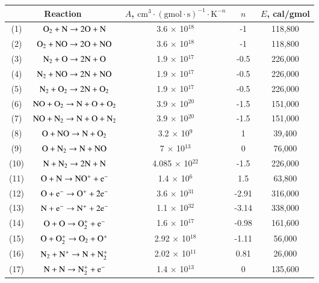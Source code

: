 \documentclass{warpdoc}
\renewcommand{\fontsizetable}{\footnotesize\scalefont{0.9}}
\begin{document}
%
\begin{table}[t]
\fontsizetable
\begin{center}
\begin{threeparttable}
\begin{tabular}{ccccc} 
\toprule
\multicolumn{2}{c}{Reaction} & $A$, $\textrm{cm}^3\cdot(\textrm{gmol}\cdot \textrm{s})^{-1}\cdot \textrm{K}^{-n}$ & $n$ & $E$, cal/gmol  \\ 
\midrule
(1) & $\rm O_2 + N \rightarrow 2O+N$ & 3.6 $\times$ 10$^{18}$  & -1 & 118,800 \\
(2) & $\rm O_2 + NO \rightarrow 2O+NO$ & 3.6 $\times$ 10$^{18}$ & -1 & 118,800 \\
(3) & $\rm N_2 + O \rightarrow 2N+O$ & 1.9 $\times$ 10$^{17}$ & -0.5 & 226,000 \\
(4) & $\rm N_2 + NO \rightarrow 2N+NO$ & 1.9 $\times$ 10$^{17}$ & -0.5 & 226,000 \\
(5) & $\rm N_2 + O_2 \rightarrow 2N+O_2$ & 1.9 $\times$ 10$^{17}$ & -0.5 & 226,000 \\
(6) & $\rm NO + O_2 \rightarrow N+O+O_2$ & 3.9 $\times$ 10$^{20}$ & -1.5 & 151,000 \\
(7) & $\rm NO + N_2 \rightarrow N+O+N_2$ & 3.9 $\times$ 10$^{20}$ & -1.5 & 151,000 \\
(8) & $\rm O + NO \rightarrow N+O_2$ & 3.2 $\times$ 10$^{9}$ & 1 & 39,400 \\
(9) & $\rm O + N_2 \rightarrow N+NO$ & 7 $\times$ 10$^{13}$ & 0 & 76,000 \\
(10) & $\rm N + N_2 \rightarrow 2N+N$ & 4.085 $\times$ 10$^{22}$ & -1.5 & 226,000 \\
(11) & $\rm O + N \rightarrow NO^{+}+e^{-}$ & 1.4 $\times$ 10$^{6}$ & 1.5 & 63,800 \\
(12) & $\rm O + e^- \rightarrow O^++2e^-$ & 3.6 $\times$ 10$^{31}$ & -2.91 & 316,000 \\
(13) & $\rm N + e^- \rightarrow N^++2e^-$ & 1.1 $\times$ 10$^{32}$ & -3.14 & 338,000 \\
(14) & $\rm O + O \rightarrow O_2^{+}+e^-$ & 1.6 $\times$ 10$^{17}$ & -0.98 & 161,600 \\
(15) & $\rm O + O_2^+ \rightarrow O_2+O^+$ & 2.92 $\times$ 10$^{18}$ & -1.11 & 56,000 \\
(16) & $\rm N_2 + N^+ \rightarrow N+N_2^{+}$ & 2.02 $\times$ 10$^{11}$ & 0.81 & 26,000 \\
(17) & $\rm N + N \rightarrow N_2^{+} + e^-$ & 1.4 $\times$ 10$^{13}$ & 0 & 135,600 \\

\end{tabular}
\end{threeparttable}
\end{center}
\end{table}
\end{document}
